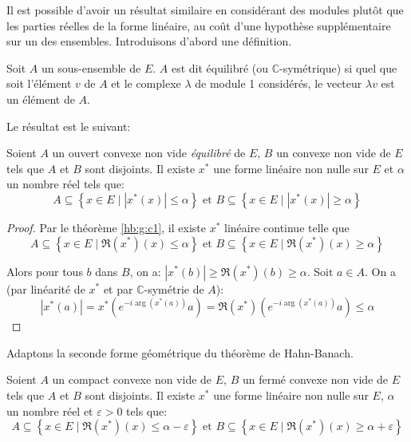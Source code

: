Il est possible d'avoir un résultat similaire en considérant
des modules plutôt que les parties réelles de la forme linéaire,
au coût d'une hypothèse supplémentaire sur un des ensembles.
Introduisons d'abord une définition.

\begin{df}
  Soit $A$ un sous-ensemble de $E$. $A$ est dit équilibré
  (ou $\mathbb{C}$-symétrique) si quel que soit
  l'élément $v$ de $A$ et le complexe $\lambda$ de module 1 considérés, le vecteur
  $\lambda{}v$ est un élément de $A$.
\end{df}

Le résultat est le suivant:

\begin{cor}\label{hb:g:cc1}
  Soient $A$ un ouvert convexe non vide \emph{équilibré} de $E$, $B$ un
  convexe non vide de $E$ tels que $A$ et $B$ sont disjoints. Il existe
  $x^*$ une forme linéaire non nulle sur $E$ et $\alpha$ un nombre réel tels que:
  $$A\subseteq \left\{x\in E\mid |x^*(x)| \leq \alpha\right\} \mbox{ et }
  B\subseteq \left\{x\in E\mid |x^*(x)| \geq \alpha\right\} $$
\end{cor}


\begin{proof}

  Par le théorème \ref{hb:g:c1}, il existe $x^*$ linéaire continue telle que
  $$A\subseteq \left\{x\in E\mid \Re(x^*)(x) \leq \alpha\right\} \mbox{ et }
  B\subseteq \left\{x\in E\mid \Re(x^*)(x) \geq \alpha\right\} $$

  Alors pour tous $b$ dans $B$,
  on a: $|x^*(b)|\geq \Re(x^*)(b) \geq \alpha$.
  Soit $a\in A$. On a (par linéarité de $x^*$ et par $\mathbb{C}$-symétrie
  de $A$):
  $$|x^*(a)| = x^*(e^{-i\arg(x^*(a))}a) =
  \Re(x^*)(e^{-i\arg(x^*(a))}a)\leq \alpha$$
\end{proof}

Adaptons la seconde forme géométrique du théorème de Hahn-Banach.
\begin{thm}
  Soient $A$ un compact convexe non vide de $E$, $B$ un fermé
  convexe non vide de $E$ tels que $A$ et $B$ sont disjoints. Il existe
  $x^*$ une forme linéaire non nulle sur $E$, $\alpha$ un nombre réel et
  $\varepsilon > 0$ tels que:
  $$A\subseteq \left\{x\in E\mid \Re(x^*)(x) \leq \alpha-\varepsilon\right\} \mbox{ et }
  B\subseteq \left\{x\in E\mid \Re(x^*)(x) \geq \alpha+\varepsilon\right\} $$
\end{thm}

